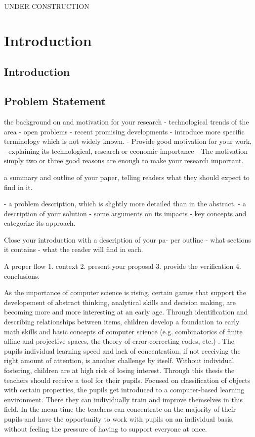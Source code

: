 
\setcounter{chapter}{0}
UNDER CONSTRUCTION

\chapter{Introduction}
\label{chap:introduction}

\section{Introduction}
\section{Problem Statement}


the background on and motivation for your research
- technological trends of the area
- open problems
- recent promising developments
- introduce more specific terminology which is not widely known.
- Provide good motivation for your work,
- explaining its technological, research or economic importance
- The motivation simply two or three good reasons are enough to
make your research important.

a summary and outline of your paper, telling readers what they should expect to find in it.

- a problem description, which is slightly more detailed than in the abstract.
- a description of your solution
- some arguments on its impacts
- key concepts and categorize its approach.

Close your introduction with a description of your pa-
per outline
- what sections it contains
- what the reader will find in each.

A proper flow
1. context
2. present your proposal
3. provide the verification
4. conclusions.

As the importance of computer science is rising, certain games that support the
developement of abstract thinking, analytical skills and decision making, are
becoming more and more interesting at an early age. Through identification and
describing relationships between items, children develop a foundation to early
math skills and basic concepts of computer science (e.g. combinatorics of finite
affine and projective spaces, the theory of error-correcting codes, etc.)
. The pupils individual learning speed and lack of concentration, if
not receiving the right amount of attention, is another challenge by itself.
Without individual fostering, children are at high risk of losing interest.
Through this thesis the teachers should receive a tool for their pupils. Focused
on classification of objects with certain properties, the pupils get introduced
to a computer-based learning environment. There they can individually train and
improve themselves in this field. In the mean time the teachers can concentrate
on the majority of their pupils and have the opportunity to work with pupils on
an individual basis, without feeling the pressure of having to support everyone
at once.


